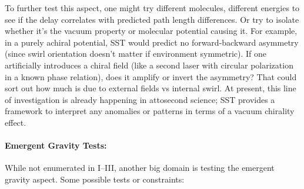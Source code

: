 \documentclass[10pt,reprint,aps,onecolumn,nofootinbib]{revtex4-2}
\begin{document}
To further test this aspect, one might try different molecules, different energies to see if the delay correlates with predicted path length differences. Or try to isolate whether it’s the vacuum property or molecular potential causing it. For example, in a purely achiral potential, SST would predict no forward-backward asymmetry (since swirl orientation doesn’t matter if environment symmetric). If one artificially introduces a chiral field (like a second laser with circular polarization in a known phase relation), does it amplify or invert the asymmetry? That could sort out how much is due to external fields vs internal swirl. At present, this line of investigation is already happening in attosecond science; SST provides a framework to interpret any anomalies or patterns in terms of a vacuum chirality effect.


\paragraph{Emergent Gravity Tests:}

While not enumerated in I--III, another big domain is testing the emergent gravity aspect. Some possible tests or constraints:
\end{document}
